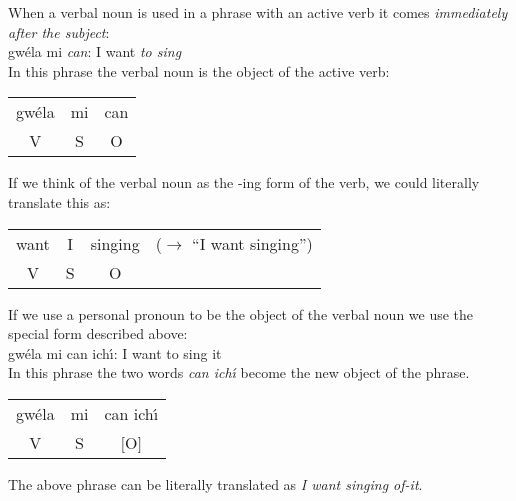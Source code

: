 When a verbal noun is used in a phrase with an active verb it comes \textit{immediately after the subject}:\\

gw\'{e}la mi \textit{can}: I want \textit{to sing}\\

In this phrase the verbal noun is the object of the active verb:
\begin{table}[H]
\begin{tabular}{ccc}
  gw\'{e}la & mi & can\\
  V & S & O
\end{tabular}
\label{verbal_noun_object_of_active_verb}
\end{table}

If we think of the verbal noun as the -ing form of the verb, we could literally translate this as:
\begin{table}[H]
\begin{tabular}{cccc}
  want & I & singing & ($\rightarrow$ ``I want singing'')\\
  V & S & O &
\end{tabular}
\label{verbal_noun_ing_form}
\end{table}

If we use a personal pronoun to be the object of the verbal noun we use the special form described above:\\
gw\'{e}la mi can ich\'{\i}: I want to sing it\\

In this phrase the two words \textit{can ich\'{\i}} become the new object of the phrase.
\begin{table}[H]
\begin{tabular}{ccc}
    gw\'{e}la & mi & can ich\'{\i}\\
    V & S & $[$\hspace{0.5cm}O\hspace{0.5cm}$]$
\end{tabular}
\label{personal_pronoun_as_object_of_verbal_noun}
\end{table}

The above phrase can be literally translated as \textit{I want singing of-it}.\\

